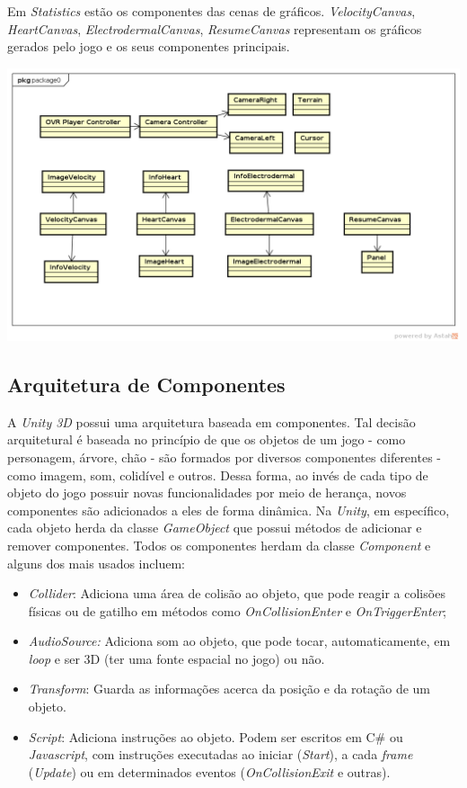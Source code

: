 Em \textit{Statistics} estão os componentes das cenas de gráficos. \textit{VelocityCanvas}, \textit{HeartCanvas}, \textit{ElectrodermalCanvas}, \textit{ResumeCanvas} representam os gráficos gerados pelo jogo e os seus componentes principais.


\begin{center}
	\includegraphics[scale=0.5]{figuras/statistics}
	\label{figura:statistics}
\end{center}

\subsection{Arquitetura de Componentes}

A \textit{Unity 3D} possui uma arquitetura baseada em componentes. Tal decisão arquitetural é baseada no princípio de que os objetos de um jogo - como personagem, árvore, chão - são formados por diversos componentes diferentes - como imagem, som, colidível e outros. Dessa forma, ao invés de cada tipo de objeto do jogo possuir novas funcionalidades por meio de herança, novos componentes são adicionados a eles de forma dinâmica. Na \textit{Unity}, em específico, cada objeto herda da classe \textit{GameObject} que possui métodos de adicionar e remover componentes. Todos os componentes herdam da classe \textit{Component} e alguns dos mais usados incluem:

\begin{itemize}
\item \textit{Collider}: Adiciona uma área de colisão ao objeto, que pode reagir a colisões físicas ou de gatilho em métodos como \textit{OnCollisionEnter} e \textit{OnTriggerEnter};
\item \textit{AudioSource:} Adiciona som ao objeto, que pode tocar, automaticamente, em \textit{loop} e ser 3D (ter uma fonte espacial no jogo) ou não.
\item \textit{Transform}: Guarda as informações acerca da posição e da rotação de um objeto.
\item \textit{Script}: Adiciona instruções ao objeto. Podem ser escritos em C\# ou \textit{Javascript}, com instruções executadas ao iniciar (\textit{Start}), a cada \textit{frame} (\textit{Update}) ou em determinados eventos (\textit{OnCollisionExit} e outras).
\end{itemize}

